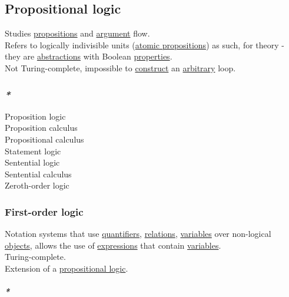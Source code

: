 \documentclass[a4paper,14pt,oneside]{book}
\begin{document}
{\subsection{\label{org0eb19b7}Propositional logic}
\label{sec:orgc90a812}
Studies \hyperref[org038788e]{propositions} and \hyperref[orgdd12744]{argument} flow.\\

Refers to logically indivisible units (\hyperref[org140bbc9]{atomic propositions}) as such, for theory - they are \hyperref[org3137fb7]{abstractions} with Boolean \hyperref[org5fc06ca]{properties}.\\

Not Turing-complete, impossible to \hyperref[orgadd667a]{construct} an \hyperref[org4a2927f]{arbitrary} loop.\\

\subsubsection{\emph{*}}
\label{sec:org06f2e8f}

\label{org8331641}Proposition logic\\
\label{org99cce70}Proposition calculus\\
\label{org59c60eb}Propositional calculus\\
\label{orgd05c01f}Statement logic\\
\label{orgfbdb67e}Sentential logic\\
\label{orgb321c87}Sentential calculus\\
\label{org614430f}Zeroth-order logic\\

\subsubsection{\label{orgbdb19a6}First-order logic}
\label{sec:orgef4f630}
Notation systems that use \hyperref[org52e2af2]{quantifiers}, \hyperref[org7713e01]{relations}, \hyperref[org3e16d0c]{variables} over non-logical \hyperref[org7c09bf4]{objects}, allows the use of \hyperref[org6328353]{expressions} that contain \hyperref[org3e16d0c]{variables}.\\

Turing-complete.\\

Extension of a \hyperref[org0eb19b7]{propositional logic}.\\

\paragraph{\emph{*}}
\label{sec:orge141547}

}
\end{document}
